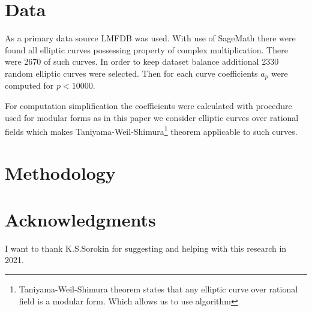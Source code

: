 \documentclass[11pt]{article}
\begin{document}
    \section{Data}\label{sec:data}
    As a primary data source LMFDB was used.
    With use of SageMath there were found all elliptic curves possessing property of complex multiplication.
    There were 2670 of such curves.
    In order to keep dataset balance additional 2330 random elliptic curves
    were selected.
    Then for each curve coefficients $a_p$ were computed for $p<10000$.

    For computation simplification the coefficients were calculated with procedure used for modular forms as in this paper
    we consider
    elliptic curves over rational fields which makes Taniyama-Weil-Shimura\footnote{Taniyama-Weil-Shimura theorem
    states that any elliptic curve over rational field is a modular form. Which allows us to use algorithm } theorem
    applicable to such curves.

    \section{Methodology}\label{sec:methodology}

    \section{Acknowledgments}\label{sec:acknowlodgements}
    I want to thank K.S.Sorokin for suggesting and helping with this research in 2021.
\end{document}

